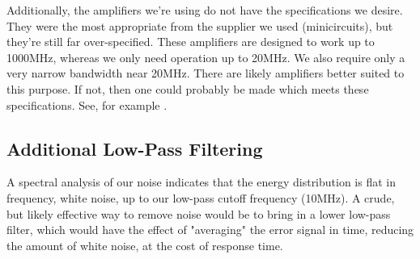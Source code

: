 Additionally, the amplifiers we're using do not have the specifications we desire.  They were the most appropriate from the supplier we used (minicircuits), but they're still far over-specified.  These amplifiers are designed to work up to 1000MHz, whereas we only need operation up to 20MHz.  We also require only a very narrow bandwidth near 20MHz.  There are likely amplifiers better suited to this purpose.  If not, then one could probably be made which meets these specifications.  See, for example \cite{ti_amps}.

\subsection{Additional Low-Pass Filtering}

A spectral analysis of our noise indicates that the energy distribution is flat in frequency, white noise, up to our low-pass cutoff frequency (10MHz).  A crude, but likely effective way to remove noise would be to bring in a lower low-pass filter, which would have the effect of "averaging" the error signal in time, reducing the amount of white noise, at the cost of response time.
